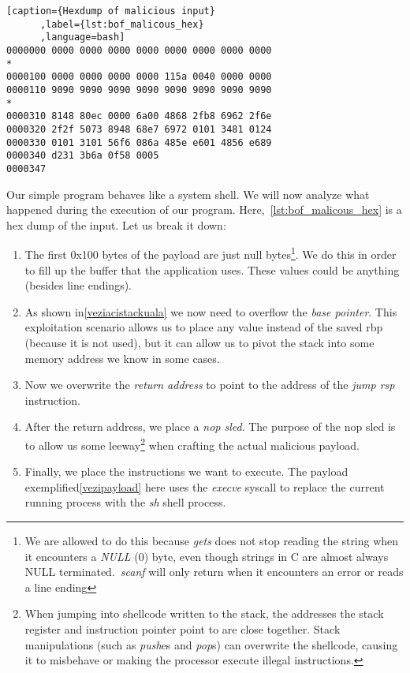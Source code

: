 \documentclass{article}
\begin{document}
\begin{lstlisting}[caption={Hexdump of malicious input}
      ,label={lst:bof_malicous_hex}
      ,language=bash]
0000000 0000 0000 0000 0000 0000 0000 0000 0000
*
0000100 0000 0000 0000 0000 115a 0040 0000 0000
0000110 9090 9090 9090 9090 9090 9090 9090 9090
*
0000310 8148 80ec 0000 6a00 4868 2fb8 6962 2f6e
0000320 2f2f 5073 8948 68e7 6972 0101 3481 0124
0000330 0101 3101 56f6 086a 485e e601 4856 e689
0000340 d231 3b6a 0f58 0005
0000347
\end{lstlisting}
Our simple program behaves like a system shell. We will now analyze what happened during the execution of our program. Here,~\ref {lst:bof_malicous_hex} is a hex dump of the input. Let us break it down:
\begin{enumerate}
  \item The first 0x100 bytes of the payload are just null bytes\footnote{We are allowed to do this because \emph{gets} does not stop reading the string when it encounters a \emph{NULL} (0) byte, even though strings in C are almost always NULL terminated.~\emph{scanf} will only return when it encounters an error or reads a line ending}. We do this in order to fill up the buffer that the application uses. These values could be anything (besides line endings).
  \item As shown in\ref{veziacistackuala} we now need to overflow the \emph{base pointer}. This exploitation scenario allows us to place any value instead of the saved rbp (because it is not used), but it can allow us to pivot the stack into some memory address we know in some cases.
  \item Now we overwrite the \emph{return address} to point to the address of the \emph{jump rsp} instruction.
  \item After the return address, we place a \emph{nop sled}. The purpose of the nop sled is to allow us some leeway\footnote{When jumping into shellcode written to the stack, the addresses the stack register and instruction pointer point to are close together. Stack manipulations (such as \emph{push}es and \emph{pop}s) can overwrite the shellcode, causing it to misbehave or making the processor execute illegal instructions.} when crafting the actual malicious payload.
  \item Finally, we place the instructions we want to execute. The payload exemplified\ref{vezipayload} here uses the \emph{execve} syscall to replace the current running process with the \emph{sh} shell process.
\end{enumerate}
\end{document}
